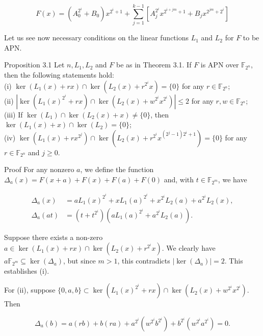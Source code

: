 \documentclass[10pt]{article}
\begin{document}
$$
F(x)=\left(A_{0}^{2^{i}}+B_{0}\right) x^{2^{i}+1}+\sum_{j=1}^{k-1}\left[A_{j}^{2^{i}} x^{2^{i+j m}+1}+B_{j} x^{2^{j m}+2^{i}}\right]
$$

Let us see now necessary conditions on the linear functions $L_{1}$ and $L_{2}$ for $F$ to be APN.

Proposition 3.1 Let $n, L_{1}, L_{2}$ and $F$ be as in Theorem 3.1. If $F$ is APN over $\mathbb{F}_{2^{n}}$, then the following statements hold:\\
(i) $\operatorname{ker}\left(L_{1}(x)+r x\right) \cap \operatorname{ker}\left(L_{2}(x)+r^{2^{i}} x\right)=\{0\}$ for any $r \in \mathbb{F}_{2^{n}}$;\\
(ii) $\left|\operatorname{ker}\left(L_{1}(x)^{2^{i}}+r x\right) \cap \operatorname{ker}\left(L_{2}(x)+w^{2^{i}} x^{2^{i}}\right)\right| \leq 2$ for any $r, w \in \mathbb{F}_{2^{n}}$;\\
(iii) If $\operatorname{ker}\left(L_{1}\right) \cap \operatorname{ker}\left(L_{2}(x)+x\right) \neq\{0\}$, then $\operatorname{ker}\left(L_{1}(x)+x\right) \cap \operatorname{ker}\left(L_{2}\right)=\{0\}$;\\
(iv) $\operatorname{ker}\left(L_{1}(x)+r x^{2^{j}}\right) \cap \operatorname{ker}\left(L_{2}(x)+r^{2^{i}} x^{\left(2^{j}-1\right) 2^{i}+1}\right)=\{0\}$ for any $r \in \mathbb{F}_{2^{n}}$ and $j \geq 0$.

Proof For any nonzero $a$, we define the function $\Delta_{a}(x)=F(x+a)+F(x)+F(a)+ F(0)$ and, with $t \in \mathbb{F}_{2^{m}}$, we have

$$
\begin{aligned}
\Delta_{a}(x) & =a L_{1}(x)^{2^{i}}+x L_{1}(a)^{2^{i}}+x^{2^{i}} L_{2}(a)+a^{2^{i}} L_{2}(x), \\
\Delta_{a}(a t) & =\left(t+t^{2^{i}}\right)\left(a L_{1}(a)^{2^{i}}+a^{2^{i}} L_{2}(a)\right) .
\end{aligned}
$$

Suppose there exists a non-zero $a \in \operatorname{ker}\left(L_{1}(x)+r x\right) \cap \operatorname{ker}\left(L_{2}(x)+r^{2^{i}} x\right)$. We clearly have $a \mathbb{F}_{2^{m}} \subseteq \operatorname{ker}\left(\Delta_{a}\right)$, but since $m>1$, this contradicts $\left|\operatorname{ker}\left(\Delta_{a}\right)\right|=2$. This establishes (i).

For (ii), suppose $\{0, a, b\} \subset \operatorname{ker}\left(L_{1}(x)^{2^{i}}+r x\right) \cap \operatorname{ker}\left(L_{2}(x)+w^{2^{i}} x^{2^{i}}\right)$. Then

$$
\Delta_{a}(b)=a(r b)+b(r a)+a^{2^{i}}\left(w^{2^{i}} b^{2^{i}}\right)+b^{2^{i}}\left(w^{2^{i}} a^{2^{i}}\right)=0 .
$$
\end{document}
